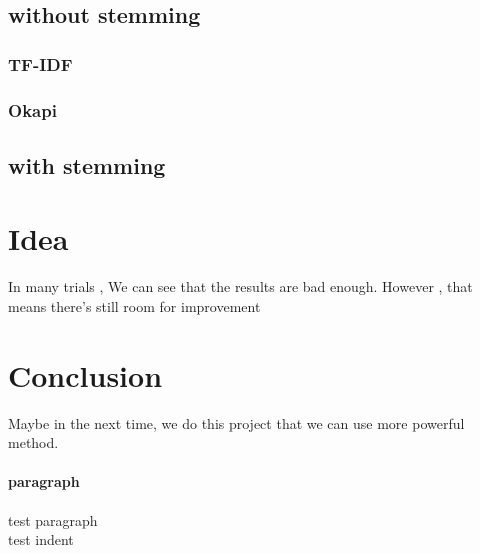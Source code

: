 \documentclass[a4pper,11pt,onecolumn]{article}
\begin{document}
\subsection{without stemming}
\subsubsection{TF-IDF}
\subsubsection{Okapi}
\subsection{with stemming}

\section{Idea}
In many trials , We can see that the results are bad enough. However , that means there's still room for improvement
\section{Conclusion}
Maybe in the next time, we do this project that we can use more powerful method.
\paragraph{paragraph}
 test paragraph
\\\indent test indent
\end{document}

